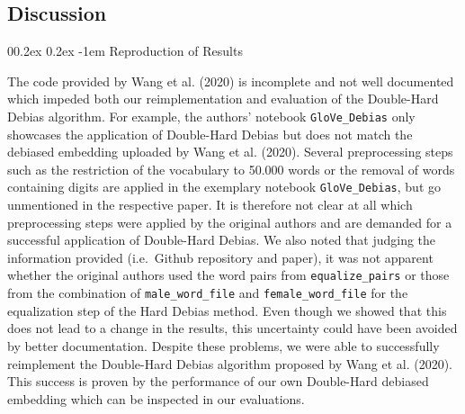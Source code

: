 \documentclass[
  english,
  man,floatsintext]{apa6}
\makeatletter
\let\oldparagraph\paragraph
\renewcommand{\paragraph}[1]{\oldparagraph{#1}\mbox{}}
\renewcommand{\paragraph}{\@startsection{paragraph}{4}{\parindent}%
  {0\baselineskip \@plus 0.2ex \@minus 0.2ex}%
  {-1em}%
  {\normalfont\normalsize\bfseries\itshape\typesectitle}}
\makeatother
\begin{document}
\hypertarget{discussion}{%
\subsection{Discussion}\label{discussion}}

\hypertarget{reproduction-of-results}{%
\paragraph{Reproduction of Results}\label{reproduction-of-results}}

The code provided by Wang et al. (2020) is incomplete and not well documented which impeded both our reimplementation and evaluation of the Double-Hard Debias algorithm. For example, the authors' notebook \texttt{GloVe\_Debias} only showcases the application of Double-Hard Debias but does not match the debiased embedding uploaded by Wang et al. (2020). Several preprocessing steps such as the restriction of the vocabulary to 50.000 words or the removal of words containing digits are applied in the exemplary notebook \texttt{GloVe\_Debias}, but go unmentioned in the respective paper. It is therefore not clear at all which preprocessing steps were applied by the original authors and are demanded for a successful application of Double-Hard Debias.
We also noted that judging the information provided (i.e.~Github repository and paper), it was not apparent whether the original authors used the word pairs from \texttt{equalize\_pairs} or those from the combination of \texttt{male\_word\_file} and \texttt{female\_word\_file} for the equalization step of the Hard Debias method. Even though we showed that this does not lead to a change in the results, this uncertainty could have been avoided by better documentation.
Despite these problems, we were able to successfully reimplement the Double-Hard Debias algorithm proposed by Wang et al. (2020). This success is proven by the performance of our own Double-Hard debiased embedding which can be inspected in our evaluations.
\end{document}
